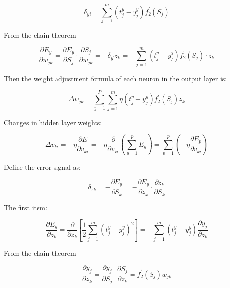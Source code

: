 \documentclass[12pt]{article}  %
\begin{document}
\begin{equation}\label{eq:heat11}\delta_{y i}=\sum_{j=1}^{m}\left(t_{j}^{y}-y_{j}^{y}\right) f_{2}^{\prime}\left(S_{j}\right)\end{equation}

From the chain theorem:

\begin{equation}\label{eq:heat12}\frac{\partial E_{y}}{\partial w_{j k}}=\frac{\partial E_{y}}{\partial S_{j}} \cdot \frac{\partial S_{j}}{\partial w_{j k}}=-\delta_{y^{\prime}} z_{k}=-\sum_{j=1}^{m}\left(t_{j}^{y}-y_{j}^{y}\right) f_{2}^{\prime}\left(S_{j}\right) \cdot z_{k}\end{equation}

Then the weight adjustment formula of each neuron in the output layer is:

\begin{equation}\label{eq:heat13}\Delta w_{j k}=\sum_{y=1}^{P} \sum_{j=1}^{m} \eta\left(t_{j}^{y}-y_{j}^{y}\right) f_{2}^{t}\left(S_{j}\right) z_{k}\end{equation}

Changes in hidden layer weights:

\begin{equation}\label{eq:heat14}\Delta v_{k i}=-\eta \frac{\partial E}{\partial v_{k i}}=-\eta \frac{\partial}{\partial v_{k i}}\left(\sum_{y=1}^{p} E_{y}\right)=\sum_{p=1}^{p}\left(-\eta \frac{\partial E_{p}}{\partial v_{k i}}\right)\end{equation}

Define the error signal as:

\begin{equation}\label{eq:heat15}\delta_{z k}=-\frac{\partial E_{y}}{\partial S_{k}}=-\frac{\partial E_{y}}{\partial z_{x}} \cdot \frac{\partial z_{k}}{\partial S_{k}}\end{equation}

The first item:

\begin{equation}\label{eq:heat15}\frac{\partial E_{y}}{\partial z_{k}}=\frac{\partial}{\partial z_{k}}\left[\frac{1}{2} \sum_{j=1}^{m}\left(t_{j}^{y}-y_{j}^{y}\right)^{2}\right]=-\sum_{j=1}^{m}\left(t_{j}^{y}-y_{j}^{y}\right) \frac{\partial y_{j}}{\partial z_{k}}\end{equation}

From the chain theorem:

\begin{equation}\label{eq:heat15}\frac{\partial y_{j}}{\partial z_{k}}=\frac{\partial y_{j}}{\partial S_{j}} \cdot \frac{\partial S_{j}}{\partial z_{k}}=f_{2}^{\prime}\left(S_{j}\right) w_{j k}\end{equation}
\end{document}
